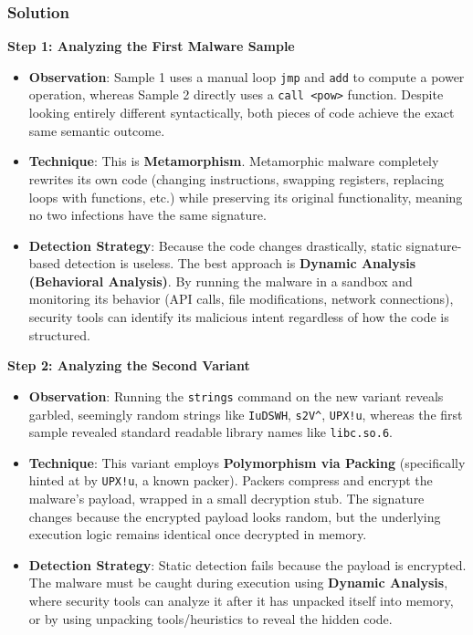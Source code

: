 \documentclass{article}
\begin{document}
\subsubsection*{Solution}
\textbf{Step 1: Analyzing the First Malware Sample}
\begin{itemize}
    \item \textbf{Observation}: Sample 1 uses a manual loop \texttt{jmp} and \texttt{add} to compute a power operation, whereas Sample 2 directly uses a \texttt{call <pow>} function. Despite looking entirely different syntactically, both pieces of code achieve the exact same semantic outcome.
    \item \textbf{Technique}: This is \textbf{Metamorphism}. Metamorphic malware completely rewrites its own code (changing instructions, swapping registers, replacing loops with functions, etc.) while preserving its original functionality, meaning no two infections have the same signature.
    \item \textbf{Detection Strategy}: Because the code changes drastically, static signature-based detection is useless. The best approach is \textbf{Dynamic Analysis (Behavioral Analysis)}. By running the malware in a sandbox and monitoring its behavior (API calls, file modifications, network connections), security tools can identify its malicious intent regardless of how the code is structured.

\end{itemize}
\textbf{Step 2: Analyzing the Second Variant}
\begin{itemize}
    \item \textbf{Observation}: Running the \texttt{strings} command on the new variant reveals garbled, seemingly random strings like \texttt{IuDSWH}, \texttt{s2V\textasciicircum{}}, \texttt{UPX!u}, whereas the first sample revealed standard readable library names like \texttt{libc.so.6}.
    \item \textbf{Technique}: This variant employs \textbf{Polymorphism via Packing} (specifically hinted at by \texttt{UPX!u}, a known packer). Packers compress and encrypt the malware's payload, wrapped in a small decryption stub. The signature changes because the encrypted payload looks random, but the underlying execution logic remains identical once decrypted in memory.
    \item \textbf{Detection Strategy}: Static detection fails because the payload is encrypted. The malware must be caught during execution using \textbf{Dynamic Analysis}, where security tools can analyze it after it has unpacked itself into memory, or by using unpacking tools/heuristics to reveal the hidden code.
\end{itemize}
\end{document}
